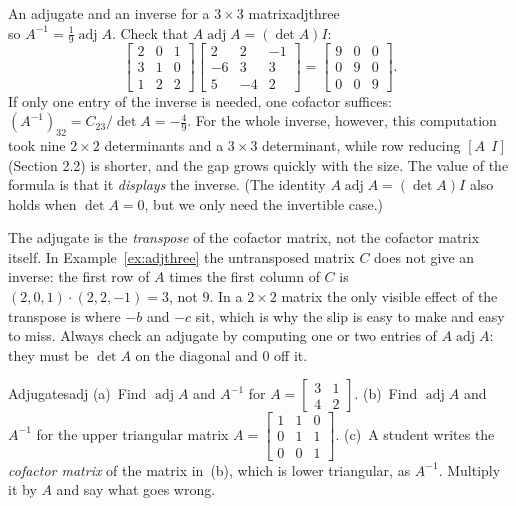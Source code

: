 \documentclass[11pt]{article}
\begin{document}
\begin{exmp}{An adjugate and an inverse for a $3\times3$ matrix}{adjthree}
\[\]
so $A^{-1}=\tfrac19\operatorname{adj}A$. Check that $A\operatorname{adj}A=(\det A)I$:
\[
\begin{bmatrix}2&0&1\\3&1&0\\1&2&2\end{bmatrix}\begin{bmatrix}2&2&-1\\-6&3&3\\5&-4&2\end{bmatrix}=\begin{bmatrix}9&0&0\\0&9&0\\0&0&9\end{bmatrix}.
\]
If only one entry of the inverse is needed, one cofactor suffices: $(A^{-1})_{32}=C_{23}/\det A=-\tfrac49$. For the whole inverse, however, this computation took nine $2\times2$ determinants and a $3\times3$ determinant, while row reducing $[A\ \ I]$ (Section 2.2) is shorter, and the gap grows quickly with the size. The value of the formula is that it \emph{displays} the inverse. (The identity $A\operatorname{adj}A=(\det A)I$ also holds when $\det A=0$, but we only need the invertible case.)
\end{exmp}

\begin{warn}
The adjugate is the \emph{transpose} of the cofactor matrix, not the cofactor matrix itself. In Example~\ref{ex:adjthree} the untransposed matrix $C$ does not give an inverse: the first row of $A$ times the first column of $C$ is $(2,0,1)\cdot(2,2,-1)=3$, not $9$. In a $2\times2$ matrix the only visible effect of the transpose is where $-b$ and $-c$ sit, which is why the slip is easy to make and easy to miss. Always check an adjugate by computing one or two entries of $A\operatorname{adj}A$: they must be $\det A$ on the diagonal and $0$ off it.
\end{warn}

\begin{kc}{Adjugates}{adj}
(a)~Find $\operatorname{adj}A$ and $A^{-1}$ for $A=\begin{bmatrix}3&1\\4&2\end{bmatrix}$. (b)~Find $\operatorname{adj}A$ and $A^{-1}$ for the upper triangular matrix $A=\begin{bmatrix}1&1&0\\0&1&1\\0&0&1\end{bmatrix}$. (c)~A student writes the \emph{cofactor matrix} of the matrix in~(b), which is lower triangular, as $A^{-1}$. Multiply it by $A$ and say what goes wrong.
\end{kc}
\end{document}
